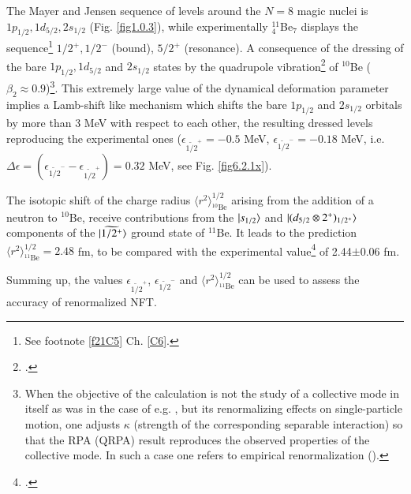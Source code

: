 The Mayer and Jensen sequence of levels around the  $N=8$ magic nuclei is $1p_{1/2},1d_{5/2},2s_{1/2}$ (Fig. \ref{fig1.0.3}), while experimentally $^{11}_{4}$Be$_{7}$ displays the sequence\footnote{See footnote \ref{f21C5} Ch. \ref{C6}.} $1/2^+,1/2^-$ (bound), $5/2^+$ (resonance). A consequence of the dressing of the bare $1p_{1/2},1d_{5/2}$ and  $2s_{1/2}$ states by the quadrupole vibration\footnote{\cite{Barranco:17}.} of $^{10}$Be ($\beta_2\approx0.9$)\footnote{When the objective of the calculation is not the study of a collective mode in itself as was in the case of e.g. \cite{Barranco:04}, but its renormalizing effects on single-particle motion, one adjusts $\kappa$ (strength of the corresponding separable interaction) so that the RPA (QRPA) result reproduces the observed properties of the collective mode. In such a case one refers to empirical renormalization (\cite{Barranco:17,Barranco:20,Broglia:16}).}. This extremely
large value of the dynamical deformation parameter implies a Lamb-shift like mechanism which shifts the bare $1p_{1/2}$ and $2s_{1/2}$ orbitals by more than 3 MeV with respect to each other, the resulting dressed levels reproducing the experimental ones ($\epsilon_{\widetilde {1/2}^+}=-0.5$ MeV, $\epsilon_{\widetilde {1/2}^-}=-0.18$ MeV, i.e. $\Delta\epsilon=\left(\epsilon_{\widetilde {1/2}^-}-\epsilon_{\widetilde {1/2}^+}\right)=0.32$ MeV, see Fig. \ref{fig6.2.1x}). 


The isotopic shift of the charge radius $\langle r^2\rangle^{1/2}_{^{10}\text{Be}}$ arising from the addition of a neutron to $^{10}$Be, receive contributions from the $|{s_{1/2}} \rangle$ and $|{(d_{5/2}\otimes2^+)_{1/2^+}} \rangle$ components of the $|{\widetilde {1/2^+}} \rangle$ ground state of $^{11}$Be. It leads to the prediction $\langle r^2\rangle^{1/2}_{^{11}\text{Be}}=2.48$ fm, to be compared with the experimental value\footnote{\cite{Nortershauser:09}.} of 2.44$\pm$0.06 fm.


Summing up, the values $\epsilon_{\widetilde {1/2}^+}$, $\epsilon_{\widetilde {1/2}^-}$ and $\langle r^2\rangle^{1/2}_{^{11}\text{Be}}$ can be used to assess the accuracy of renormalized NFT. 


